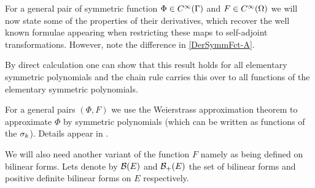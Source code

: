 For a general pair of symmetric function $\Phi\in C^{\infty}(\Gamma)$ and $F\in C^{\infty}(\Omega)$ we will now state some of the properties of their derivatives, which recover the well known formulae appearing when restricting these maps to self-adjoint transformations. However, note the difference in \eqref{DerSymmFct-A}.

{}

\begin{hproof}
By direct calculation one can show that this result holds for all elementary symmetric polynomials and the chain rule carries this over to all functions of the elementary symmetric polynomials. 

For a general pairs $(\Phi,F)$ we use the Weierstrass approximation theorem to approximate $\Phi$ by symmetric polynomials (which can be written as functions of the $\sigma_{k}$). Details appear in \cite{Scheuer:/2017}.
\end{hproof}

We will also need another variant of the function $F$ namely as being defined on bilinear forms. Lets denote by $\mathcal{B}(E)$ and $\mathcal{B}_{+}(E)$ the set of bilinear forms and positive definite bilinear forms on $E$ respectively.

{}

